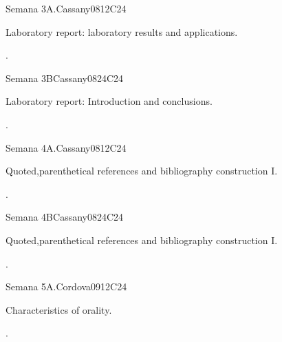 \begin{syllabus}
\begin{unit}{Semana 3A.}{}{Cassany08}{12}{C24}
   \begin{topics}
      \item Laboratory report: laboratory results and applications. 
   \end{topics}
   \begin{learningoutcomes}
      \item .
   \end{learningoutcomes}
\end{unit}

\begin{unit}{Semana 3B}{}{Cassany08}{24}{C24}
   \begin{topics}
      \item Laboratory report: Introduction and conclusions. 
   \end{topics}

   \begin{learningoutcomes}
      \item .
      \end{learningoutcomes}
\end{unit}

\begin{unit}{Semana 4A.}{}{Cassany08}{12}{C24}
   \begin{topics}
      \item Quoted,parenthetical references and bibliography construction I. 
   \end{topics}
   \begin{learningoutcomes}
      \item .
   \end{learningoutcomes}
\end{unit}

\begin{unit}{Semana 4B}{}{Cassany08}{24}{C24}
   \begin{topics}
      \item Quoted,parenthetical references and bibliography construction I.
   \end{topics}

   \begin{learningoutcomes}
      \item .
      \end{learningoutcomes}
\end{unit}


\begin{unit}{Semana 5A.}{}{Cordova09}{12}{C24}
   \begin{topics}
      \item Characteristics of orality.
   \end{topics}
   \begin{learningoutcomes}
      \item .
   \end{learningoutcomes}
\end{unit}


\end{syllabus}
